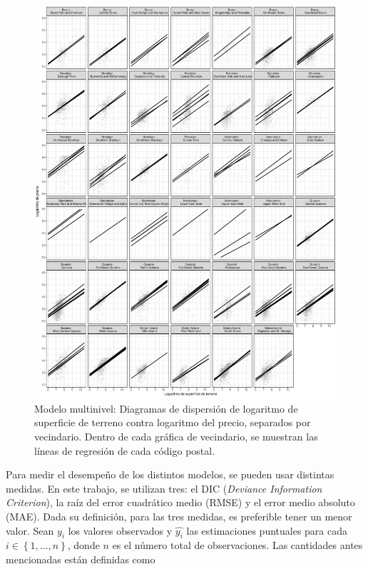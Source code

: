 \begin{figure}[H]
    \centering
    \includegraphics[width=\textwidth]{images/three_levels_obs_vs_pred_train_by_neighborhood_zip_regression_lines.pdf}
    \caption{Modelo multinivel: Diagramas de dispersión de logaritmo de superficie de terreno contra logaritmo del precio, separados por vecindario. Dentro de cada gráfica de vecindario, se muestran las líneas de regresión de cada código postal.}
    \label{fig:three_levels_obs_vs_pred_train_by_neighborhood_zip_regression_lines}
\end{figure}


Para medir el desempeño de los distintos modelos, se pueden usar distintas medidas. En este trabajo, se utilizan tres: el DIC (\textit{Deviance Information Criterion}), la raíz del error cuadrático medio (RMSE) y el error medio absoluto (MAE). Dada su definición, para las tres medidas, es preferible tener un menor valor. Sean $y_i$ los valores observados y $\hat{y_i}$ las estimaciones puntuales para cada $i \in \left\{ 1, \hdots, n \right\}$, donde $n$ es el número total de observaciones. Las cantidades antes mencionadas están definidas como

